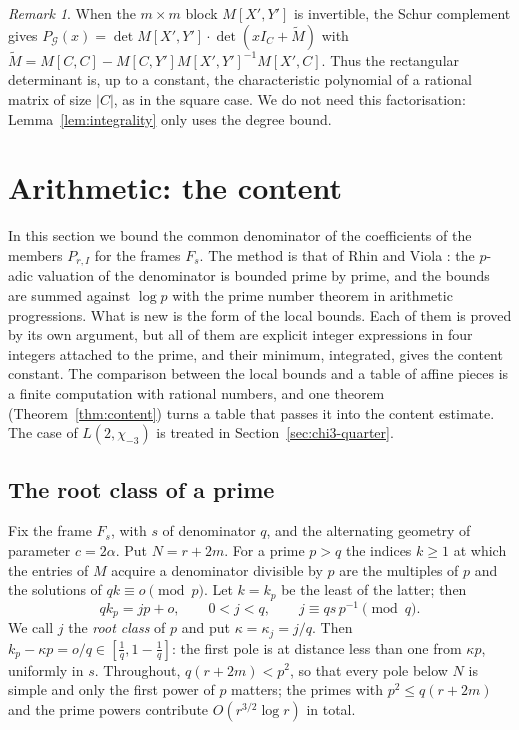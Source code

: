 \documentclass[11pt]{amsart}
\theoremstyle{definition}
\theoremstyle{remark}
\newtheorem{remark}[theorem]{Remark}
\numberwithin{equation}{section}
\begin{document}
\begin{remark}
When the $m\times m$ block $M[X',Y']$ is invertible, the Schur complement gives
$P_{\mathcal G}(x)=\det M[X',Y']\cdot\det(xI_C+\widetilde M)$ with
$\widetilde M=M[C,C]-M[C,Y']M[X',Y']^{-1}M[X',C]$. Thus the rectangular determinant is, up to a constant, the
characteristic polynomial of a rational matrix of size $|C|$, as in the square case. We do not need this
factorisation: Lemma~\ref{lem:integrality} only uses the degree bound.
\end{remark}

\section{Arithmetic: the content}\label{sec:content}

In this section we bound the common denominator of the coefficients of the members $P_{r,I}$ for the frames $F_s$.
The method is that of Rhin and Viola \cite{RhinViola96,RhinViola01}: the $p$-adic valuation of the
denominator is bounded prime by prime, and the bounds are summed against $\log p$ with the prime number theorem in
arithmetic progressions. What is new is the form of the local bounds. Each of them is proved by its own argument, but
all of them are explicit integer expressions in four integers attached to the prime, and their minimum, integrated,
gives the content constant. The comparison between the local bounds and a table of affine pieces is a finite
computation with rational numbers, and one theorem (Theorem~\ref{thm:content}) turns a table that passes it into the
content estimate. The case of $L(2,\chi_{-3})$ is treated in Section~\ref{sec:chi3-quarter}.

\subsection{The root class of a prime}
Fix the frame $F_s$, with $s$ of denominator $q$, and the alternating geometry of parameter $c=2\alpha$. Put $N=r+2m$. For
a prime $p>q$ the indices $k\ge1$ at which the entries of $M$ acquire a denominator divisible by $p$ are the multiples of
$p$ and the solutions of $qk\equiv o\pmod p$. Let $k=k_p$ be the least of the latter; then
\[
 qk_p=jp+o,\qquad 0<j<q,\qquad j\equiv qs\,p^{-1}\pmod q .
\]
We call $j$ the \emph{root class} of $p$ and put $\kappa=\kappa_j=j/q$. Then $k_p-\kappa p=o/q\in[\frac1q,1-\frac1q]$:
the first pole is at distance less than one from $\kappa p$, uniformly in $s$. Throughout,
$q(r+2m)<p^2$, so that every pole below $N$ is simple and only the first power of $p$ matters; the primes with
$p^2\le q(r+2m)$ and the prime powers contribute $O(r^{3/2}\log r)$ in total.
\end{document}
